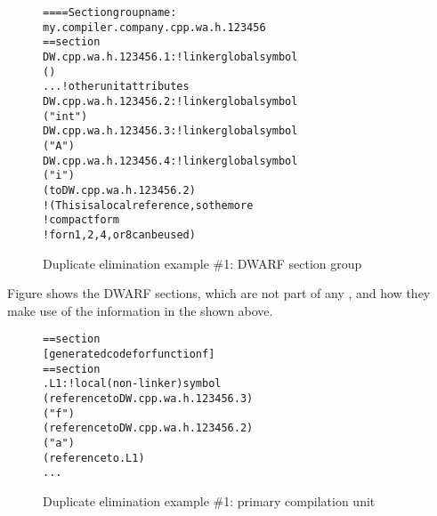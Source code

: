\begin{figure}
\begin{dwflisting}
\begin{alltt}
==== Section group name:
    my.compiler.company.cpp.wa.h.123456
== section \dotdebuginfo{}
DW.cpp.wa.h.123456.1:     ! linker global symbol
        ()
        ...  ! other unit attributes
DW.cpp.wa.h.123456.2:     ! linker global symbol
        ("int")
DW.cpp.wa.h.123456.3:     ! linker global symbol
        ("A")
DW.cpp.wa.h.123456.4:     ! linker global symbol
        ("i")
        ( to DW.cpp.wa.h.123456.2)
            ! (This is a local reference, so the more
            ! compact form  
            ! for n 1,2,4, or 8 can be used)
\end{alltt}
\end{dwflisting}
\vspace{2mm}
\caption{Duplicate elimination example \#1: DWARF section group} 
\label{fig:duplicateeliminationexample1dwarfsectiongroup}
\end{figure}

Figure 
shows the  DWARF sections, which are not part of
any , 
and how they make use of the information
in the  shown above.

\begin{figure}
\begin{dwflisting}
\begin{alltt}
== section \dottext{}
    [generated code for function f]
== section \dotdebuginfo{}
.L1:                           ! local (non-linker) symbol
            (reference to DW.cpp.wa.h.123456.3)
            ("f")
            (reference to DW.cpp.wa.h.123456.2)
                ("a")
                (reference to .L1)
        ...
\end{alltt}
\end{dwflisting}
\caption{Duplicate elimination example \#1: primary compilation unit} 
\label{fig:duplicateeliminationexample1primarycompilationunit}
\end{figure}


